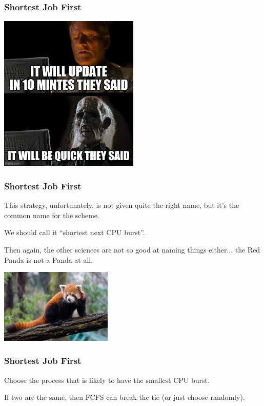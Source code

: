 \begin{frame}
\frametitle{Shortest Job First}

\begin{center}
	\includegraphics[width=0.5\textwidth]{images/quick-update.jpg}
\end{center}


\end{frame}


\begin{frame}
\frametitle{Shortest Job First}

This strategy, unfortunately, is not given quite the right name, but it's the common name for the scheme. 

We should call it ``shortest next CPU burst''.

Then again, the other sciences are not so good at naming things either... the Red Panda is not a Panda at all.

\begin{center}
	\includegraphics[width=0.4\textwidth]{images/redpanda.jpg}
\end{center}

\end{frame}


\begin{frame}
\frametitle{Shortest Job First}



Choose the process that is likely to have the smallest CPU burst. 

If two are the same, then FCFS can break the tie (or just choose randomly). 


\end{frame}

